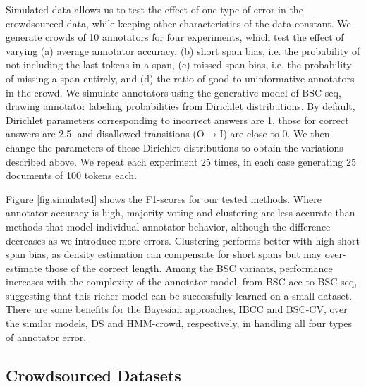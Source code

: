 Simulated data allows us to test the effect of one  
type of error in the crowdsourced data,
while keeping other characteristics of the data constant.
We generate crowds of 10 annotators for four experiments, which  
test the effect of varying
(a) average annotator accuracy,
(b) short span bias, i.e. the probability of not including the last tokens in a span, 
(c) missed span bias, i.e. the probability of missing a span entirely,
and (d) the ratio of good to uninformative annotators in the crowd.
We simulate annotators using the generative model of BSC-seq, 
drawing annotator labeling probabilities from Dirichlet distributions. 
By default, Dirichlet parameters corresponding to incorrect answers are 1,
those for correct answers are 2.5, and disallowed transitions (O$\rightarrow$I) are close to 0. 
We then change the parameters of these Dirichlet distributions 
to obtain the variations described above. 
We repeat each experiment 25 times, in each case generating 25 documents of 100 tokens each. 

Figure \ref{fig:simulated} shows the F1-scores for our tested methods. 
Where annotator accuracy is high, majority voting and clustering are less accurate than  methods that model individual annotator behavior, although the difference decreases as we introduce more errors.
Clustering performs better with high short span bias, 
as density estimation can compensate for short spans but may over-estimate
those of the correct length.
Among the BSC variants, performance increases with the complexity of the annotator model, from BSC-acc to BSC-seq,
suggesting that this richer model can be successfully learned on a small dataset. 
There are some benefits for the Bayesian approaches, IBCC and BSC-CV, over the similar  models, DS and HMM-crowd, respectively, in handling all four types of annotator error.

\subsection{Crowdsourced Datasets}\label{sec:expts}

